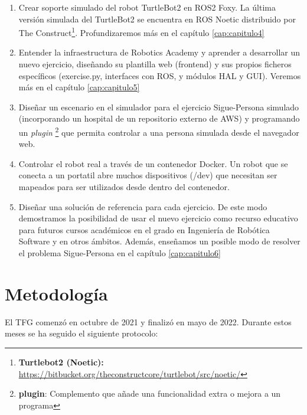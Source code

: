 \begin{enumerate}
	\item Crear soporte simulado del robot TurtleBot2 en ROS2 Foxy. La última versión simulada del TurtleBot2 se encuentra en ROS Noetic distribuido por The Construct\footnote{\textbf{Turtlebot2 (Noetic):} \url{https://bitbucket.org/theconstructcore/turtlebot/src/noetic/}}. Profundizaremos más en el capítulo \ref{cap:capitulo4}
	\item Entender la infraestructura de Robotics Academy y aprender a desarrollar un nuevo ejercicio, diseñando su plantilla web (frontend) y sus propios ficheros específicos (exercise.py, interfaces con ROS, y módulos HAL y GUI). Veremos más en el capítulo \ref{cap:capitulo5}
	\item Diseñar un escenario en el simulador para el ejercicio Sigue-Persona simulado (incorporando un hospital de un repositorio externo de AWS) y programando un \textit{plugin} \footnote{\textbf{plugin}: Complemento que añade una funcionalidad extra o mejora a un programa} que permita controlar a una persona simulada desde el navegador web.
	\item Controlar el robot real a través de un contenedor Docker. Un robot que se conecta a un portatil abre muchos dispositivos (/dev) que necesitan ser mapeados para ser utilizados desde dentro del contenedor.
	\item Diseñar una solución de referencia para cada ejercicio. De este modo demostramos la posibilidad de usar el nuevo ejercicio como recurso educativo para futuros cursos académicos en el grado en Ingeniería de Robótica Software y en otros ámbitos. Además, enseñamos un posible modo de resolver el problema Sigue-Persona en el capítulo \ref{cap:capitulo6}
\end{enumerate}



\section{Metodología}
\label{sec:metodologia}
El TFG comenzó en octubre de 2021 y finalizó en mayo de 2022. Durante estos meses se ha seguido el siguiente protocolo:

